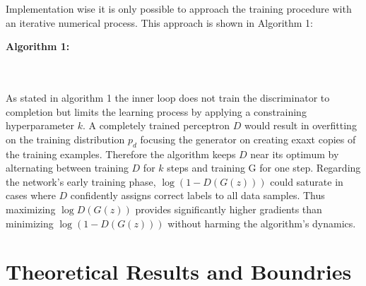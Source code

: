 \documentclass[12pt]{article}
\begin{document}
  Implementation wise it is only possible to approach the training procedure with an iterative numerical process.
  This approach is shown in Algorithm 1:

    \pagebreak
    \textbf{Algorithm 1:}
    
    \cite[Algorithm (1)]{1}
  \\
  \\
  As stated in algorithm 1 the inner loop does not train the discriminator to completion but limits the learning process by applying a constraining hyperparameter \( k \).
  A completely trained perceptron \( D \) would result in overfitting on the training distribution \( p_d \) focusing the generator on creating exaxt copies of the training examples.
  Therefore the algorithm keeps \( D \) near its optimum by alternating between training \( D \) for \( k \) steps and training G for one step.
  Regarding the network's early training phase, \( \log ( 1 - D(G(z)) ) \) could saturate in cases where \( D \) confidently assigns correct labels to all data samples.
  Thus maximizing \( \log D(G(z)) \) provides significantly higher gradients than minimizing \( \log( 1 - D(G(z)) ) \) without harming the algorithm's dynamics.

  \section{Theoretical Results and Boundries}




{}

\end{document}
